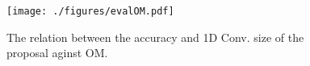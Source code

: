 \begin{figure}[h]
 \centering
 \texttt{[image: ./figures/evalOM.pdf]}
 \caption{The relation between the accuracy and 1D Conv. size of the proposal aginst OM.} 
 \label{fig:evalOM}
\end{figure}
\afterpage{\clearpage}
\newpage


